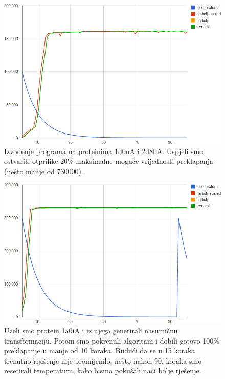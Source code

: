\documentclass[times, utf8, zavrsni]{fer}
\begin{document}
\begin{figure}
\centering
\includegraphics[scale=0.7]{res/run_1.png}
\caption[Izvođenje programa na proteinima 1d0nA i 2d8bA]{Izvođenje programa
na proteinima 1d0nA i 2d8bA. Uspjeli smo ostvariti otprilike
20\% maksimalne moguće vrijednosti preklapanja (nešto manje od 730000). }
\label{figure:run_1}
\end{figure}

\begin{figure}
\centering
\includegraphics[scale=0.7]{res/run_2.png}
\caption[Izvođenje programa na proteinu 1a0iA i njegovoj nasumičnoj
transformaciji]{Uzeli smo protein 1a0iA i iz njega generirali
nasumičnu transformaciju. Potom smo pokrenuli algoritam i dobili gotovo
100\% preklapanje u manje od 10 koraka. Budući da se u 15 koraka
trenutno riješenje nije promijenilo, nešto nakon 90. koraka
smo resetirali temperaturu, kako bismo pokušali naći bolje rješenje.}
\label{figure:run_2}
\end{figure}
\end{document}
